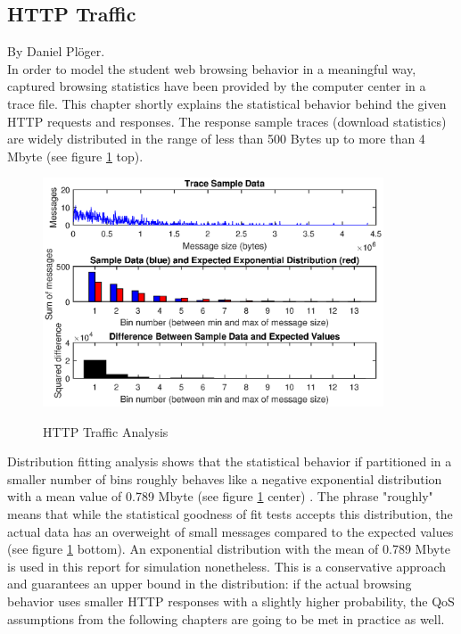 \documentclass[a4paper,10pt]{book}\usepackage{graphicx}
\begin{document}
\subsection{HTTP Traffic}
\label{chapter_http_traffic}
By Daniel Plöger.\\

In order to model the student web browsing behavior in 
a meaningful way, captured browsing statistics have been provided by the computer center in a trace file. 
This chapter shortly explains the statistical behavior behind the given HTTP 
requests and responses. The response sample traces (download statistics) are widely 
distributed in the range of less than 500 Bytes up to more than 4 Mbyte 
(see figure \ref{fig:trace} top).
\begin{figure}[!ht]
  \centering
    \includegraphics[width=0.9\textwidth]{trace_distribution.eps}
    \label{fig:trace}
    \caption{HTTP Traffic Analysis}
\end{figure}

Distribution fitting analysis shows that the statistical behavior if
 partitioned in a smaller number of bins roughly behaves like a negative 
exponential distribution with a mean value of 0.789 Mbyte (see figure \ref{fig:trace} center) \cite{goodness_of_fit}. 
The phrase "roughly" means that while the statistical goodness of fit tests accepts
 this distribution, the actual data has an overweight of small messages compared to
 the expected values (see figure \ref{fig:trace} bottom). An exponential distribution with the
 mean of 0.789 Mbyte is used in this report for simulation nonetheless. 
This is a conservative approach and guarantees an upper bound in the distribution:
 if the actual browsing behavior uses smaller HTTP responses with a slightly higher
 probability, the QoS assumptions from the following chapters are going to be met 
in practice as well.
\end{document}
